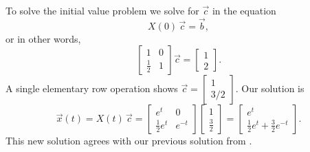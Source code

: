 \documentclass{ximera}
\begin{document}
\begin{example}
    To solve the initial value problem we solve for $\vec{c}$ in the equation
    \begin{equation*}
        X(0)\,\vec{c} = \vec{b} ,
    \end{equation*}
    or in other words,
    \begin{equation*}
        \begin{bmatrix}
            1 & 0 \\
            \frac{1}{2} & 1
        \end{bmatrix} 
        \vec{c} = 
        \begin{bmatrix}
            1 \\ 
            2
        \end{bmatrix} .
    \end{equation*}
    A single elementary row operation shows
    $\vec{c} = \left[ \begin{smallmatrix} 1 \\ 3/2 \end{smallmatrix} \right]$.
    Our solution is
    \begin{equation*}
        \vec{x}(t) = X(t)\,\vec{c} = 
        \begin{bmatrix}
            e^t & 0 \\
            \frac{1}{2} e^t & e^{-t}
        \end{bmatrix}
        \begin{bmatrix}
            1 \\ 
            \frac{3}{2}
        \end{bmatrix} =
        \begin{bmatrix}
            e^t \\
            \frac{1}{2} e^t + \frac{3}{2} e^{-t}
        \end{bmatrix} .
    \end{equation*}
    This new solution agrees with our previous solution from .
\end{example}
\end{document}
